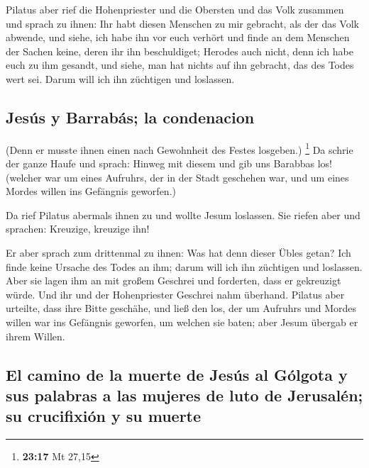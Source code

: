  Pilatus aber rief die Hohenpriester und die Obersten und
das Volk zusammen  und sprach zu ihnen: Ihr habt diesen
Menschen zu mir gebracht, als der das Volk abwende, und siehe, ich habe
ihn vor euch verhört und finde an dem Menschen der Sachen keine, deren
ihr ihn beschuldiget;  Herodes auch nicht, denn ich habe
euch zu ihm gesandt, und siehe, man hat nichts auf ihn gebracht, das des
Todes wert sei.  Darum will ich ihn züchtigen und
loslassen.

\hypertarget{jesuxfas-y-barrabuxe1s-la-condenacion}{%
\subsection{Jesús y Barrabás; la
condenacion}\label{jesuxfas-y-barrabuxe1s-la-condenacion}}

 (Denn er musste ihnen einen nach Gewohnheit des Festes
losgeben.) \footnote{\textbf{23:17} Mt 27,15}  Da schrie
der ganze Haufe und sprach: Hinweg mit diesem und gib uns Barabbas los!
 (welcher war um eines Aufruhrs, der in der Stadt
geschehen war, und um eines Mordes willen ins Gefängnis geworfen.)

 Da rief Pilatus abermals ihnen zu und wollte Jesum
loslassen.  Sie riefen aber und sprachen: Kreuzige,
kreuzige ihn!

 Er aber sprach zum drittenmal zu ihnen: Was hat denn
dieser Übles getan? Ich finde keine Ursache des Todes an ihm; darum will
ich ihn züchtigen und loslassen.  Aber sie lagen ihm an
mit großem Geschrei und forderten, dass er gekreuzigt würde. Und ihr und
der Hohenpriester Geschrei nahm überhand.  Pilatus aber
urteilte, dass ihre Bitte geschähe,  und ließ den los,
der um Aufruhrs und Mordes willen war ins Gefängnis geworfen, um welchen
sie baten; aber Jesum übergab er ihrem Willen.

\hypertarget{el-camino-de-la-muerte-de-jesuxfas-al-guxf3lgota-y-sus-palabras-a-las-mujeres-de-luto-de-jerusaluxe9n-su-crucifixiuxf3n-y-su-muerte}{%
\subsection{El camino de la muerte de Jesús al Gólgota y sus palabras a
las mujeres de luto de Jerusalén; su crucifixión y su
muerte}\label{el-camino-de-la-muerte-de-jesuxfas-al-guxf3lgota-y-sus-palabras-a-las-mujeres-de-luto-de-jerusaluxe9n-su-crucifixiuxf3n-y-su-muerte}}

